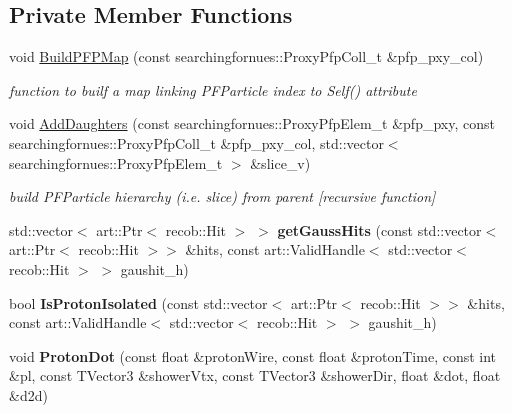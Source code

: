 \subsection*{Private Member Functions}
\begin{DoxyCompactItemize}
\item 
void \hyperlink{classProtonHitPurity_adfed832259669bb323f5a6a4eae7107e}{Build\+P\+F\+P\+Map} (const searchingfornues\+::\+Proxy\+Pfp\+Coll\+\_\+t \&pfp\+\_\+pxy\+\_\+col)
\begin{DoxyCompactList}\small\item\em function to builf a map linking P\+F\+Particle index to Self() attribute \end{DoxyCompactList}\item 
void \hyperlink{classProtonHitPurity_a7e468a256d51c80933e9bb9b6be77b94}{Add\+Daughters} (const searchingfornues\+::\+Proxy\+Pfp\+Elem\+\_\+t \&pfp\+\_\+pxy, const searchingfornues\+::\+Proxy\+Pfp\+Coll\+\_\+t \&pfp\+\_\+pxy\+\_\+col, std\+::vector$<$ searchingfornues\+::\+Proxy\+Pfp\+Elem\+\_\+t $>$ \&slice\+\_\+v)
\begin{DoxyCompactList}\small\item\em build P\+F\+Particle hierarchy (i.\+e. slice) from parent \mbox{[}recursive function\mbox{]} \end{DoxyCompactList}\item 
std\+::vector$<$ art\+::\+Ptr$<$ recob\+::\+Hit $>$ $>$ {\bfseries get\+Gauss\+Hits} (const std\+::vector$<$ art\+::\+Ptr$<$ recob\+::\+Hit $>$$>$ \&hits, const art\+::\+Valid\+Handle$<$ std\+::vector$<$ recob\+::\+Hit $>$ $>$ gaushit\+\_\+h)\hypertarget{classProtonHitPurity_af073c27c1dd243faec1019466e52dfdd}{}\label{classProtonHitPurity_af073c27c1dd243faec1019466e52dfdd}

\item 
bool {\bfseries Is\+Proton\+Isolated} (const std\+::vector$<$ art\+::\+Ptr$<$ recob\+::\+Hit $>$$>$ \&hits, const art\+::\+Valid\+Handle$<$ std\+::vector$<$ recob\+::\+Hit $>$ $>$ gaushit\+\_\+h)\hypertarget{classProtonHitPurity_a8738628194b94c23f7666d3c85170a27}{}\label{classProtonHitPurity_a8738628194b94c23f7666d3c85170a27}

\item 
void {\bfseries Proton\+Dot} (const float \&proton\+Wire, const float \&proton\+Time, const int \&pl, const T\+Vector3 \&shower\+Vtx, const T\+Vector3 \&shower\+Dir, float \&dot, float \&d2d)\hypertarget{classProtonHitPurity_a4b71c7c7e85e49f74bc98960166d1fcc}{}\label{classProtonHitPurity_a4b71c7c7e85e49f74bc98960166d1fcc}

\end{DoxyCompactItemize}

